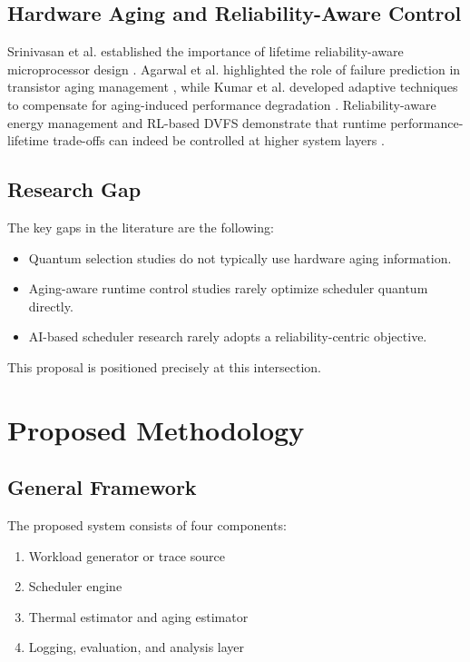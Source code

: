 \documentclass[12pt,a4paper]{article}
\begin{document}
\subsection{Hardware Aging and Reliability-Aware Control}

Srinivasan et al.
established the importance of lifetime reliability-aware microprocessor design \cite{srinivasan2004}. Agarwal et al.
highlighted the role of failure prediction in transistor aging management \cite{agarwal2007}, while Kumar et al.
developed adaptive techniques to compensate for aging-induced performance degradation \cite{kumar2011}. Reliability-aware
energy management and RL-based DVFS demonstrate that runtime performance-lifetime trade-offs can indeed be controlled
at higher system layers \cite{aydin2009,yeganeh2021}.

\subsection{Research Gap}

The key gaps in the literature are the following:

\begin{itemize}[leftmargin=*]
\item Quantum selection studies do not typically use hardware aging information.
\item Aging-aware runtime control studies rarely optimize scheduler quantum directly.
\item AI-based scheduler research rarely adopts a reliability-centric objective.
\end{itemize}

This proposal is positioned precisely at this intersection.

\section{Proposed Methodology}

\subsection{General Framework}

The proposed system consists of four components:

\begin{enumerate}[leftmargin=*]
\item Workload generator or trace source
\item Scheduler engine
\item Thermal estimator and aging estimator
\item Logging, evaluation, and analysis layer
\end{enumerate}
\end{document}
